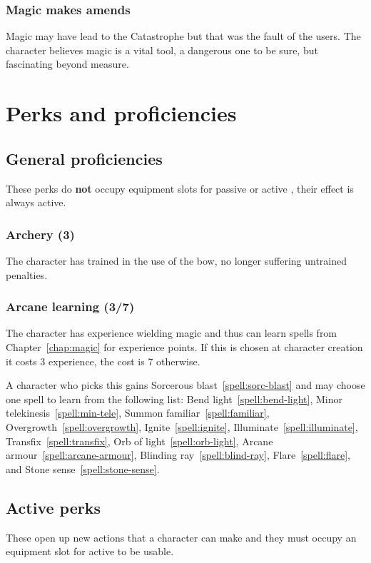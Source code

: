 \documentclass[a4paper,11pt,oneside]{book}
\newcommand{\textlf}[1]{\textbf{\titlecap{#1}}}
\begin{document}
\subsection{Magic makes amends}
Magic may have lead to the Catastrophe but that was the fault of the users. The character believes magic is a vital tool, a dangerous one to be sure, but fascinating beyond measure. 


\chapter{Perks and proficiencies}

\section{General proficiencies}
These perks do \textbf{not} occupy equipment slots for passive or active \textlf{perk}, their effect is always active.

\subsection{Archery (3)}
The character has trained in the use of the bow, no longer suffering untrained penalties.

\subsection{Arcane learning (3/7)}
The character has experience wielding magic and thus can learn spells from Chapter~\ref{chap:magic} for experience points. If this is chosen at character creation it costs 3 experience, the cost is 7 otherwise. 

A character who picks this gains Sorcerous blast~\ref{spell:sorc-blast} and may choose one spell to learn from the following list: Bend light~\ref{spell:bend-light}, Minor telekinesis~\ref{spell:min-tele}, Summon familiar~\ref{spell:familiar}, Overgrowth~\ref{spell:overgrowth}, Ignite~\ref{spell:ignite}, Illuminate~\ref{spell:illuminate}, Transfix~\ref{spell:transfix}, Orb of light~\ref{spell:orb-light}, Arcane armour~\ref{spell:arcane-armour}, Blinding ray~\ref{spell:blind-ray}, Flare~\ref{spell:flare}, and Stone sense~\ref{spell:stone-sense}.

\section{Active perks}
These open up new actions that a character can make and they must occupy an equipment slot for active \textlf{perks} to be usable.
\end{document}
